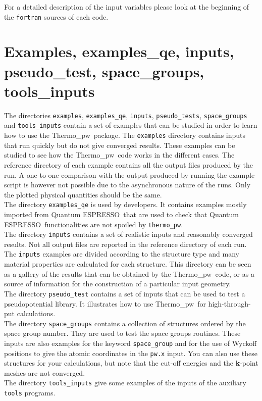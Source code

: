 \documentclass[12pt,a4paper,twoside]{report}
\def\qe{{\sc Quantum ESPRESSO}}
\def\thermo{{\sc Thermo}\_{\sc pw}}
\begin{document}
For a detailed description of the input variables please look at the beginning 
of the \texttt{fortran} sources of each code.

\newpage
{\color{dark-blue}\chapter{Examples, examples\_qe, inputs, pseudo\_test, space\_groups, \\ tools\_inputs}}
\color{black}

The directories \texttt{examples}, \texttt{examples\_qe}, \texttt{inputs}, 
\texttt{pseudo\_tests}, \texttt{space\_groups} and \texttt{tools\_inputs} 
contain a set of examples that can be studied in order to learn how to 
use the \thermo\ package. The \texttt{examples} directory contains inputs 
that run quickly but do not give converged results. These examples can 
be studied 
to see how the \thermo\ code works in the different cases. The
reference directory of each example contains all the output
files produced by the run. A one-to-one comparison with the output
produced by running the example script is however not possible due to the
asynchronous nature of the runs. Only the plotted physical quantities 
should be the same. \\
The directory \texttt{examples\_qe} is used by developers. It
contains examples mostly imported from \qe\ that are used to check that
\qe\ functionalities are not spoiled by \texttt{thermo\_pw}. \\
The directory \texttt{inputs} contains a set
of realistic inputs and reasonably converged results. Not all
output files are reported in the reference directory of each run. 
The \texttt{inputs} examples are divided according to the structure type
and many material properties are calculated for each structure.
This directory can be seen as a gallery of the results that can be
obtained by the \thermo\ code, or as a source of information for the
construction of a particular input geometry. \\
The directory \texttt{pseudo\_test} contains a set of inputs that can
be used to test a pseudopotential library. It illustrates how to use \thermo\ 
for high-through-put calculations. \\
The directory \texttt{space\_groups} contains a collection of structures
ordered by the space group number. They are used to test the space
groups routines. These inputs are also examples for the
keyword \texttt{space\_group} and for the use of Wyckoff positions to give the
atomic coordinates in the \texttt{pw.x} input. You can also use these
structures for your calculations, but note that the cut-off energies and
the {\bf k}-point meshes are not converged. \\
The directory \texttt{tools\_inputs} give some examples of the inputs of
the auxiliary \texttt{tools} programs.
\end{document}
